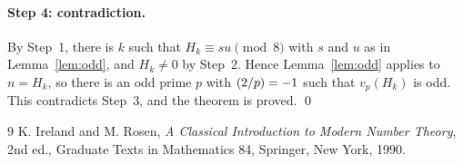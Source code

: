 \documentclass[11pt]{article}
\newcommand{\leg}[2]{\mathchoice{\biggl(\dfrac{#1}{#2}\biggr)}{(#1/#2)}{(#1/#2)}{(#1/#2)}}
\begin{document}
\paragraph{Step 4: contradiction.} By Step~1, there is $k$ such that $H_k\equiv su\pmod{8}$ with $s$ and $u$ as in Lemma~\ref{lem:odd}, and $H_k\neq0$ by Step~2. Hence Lemma~\ref{lem:odd} applies to $n=H_k$, so there is an odd prime $p$ with $\leg{2}{p}=-1$ such that $v_p(H_k)$ is odd. This contradicts Step~3, and the theorem is proved.
\qed

\begin{thebibliography}{9}
 K. Ireland and M. Rosen, \emph{A Classical Introduction to Modern Number Theory}, 2nd ed., Graduate Texts in Mathematics 84, Springer, New York, 1990.
\end{thebibliography}
\end{document}
